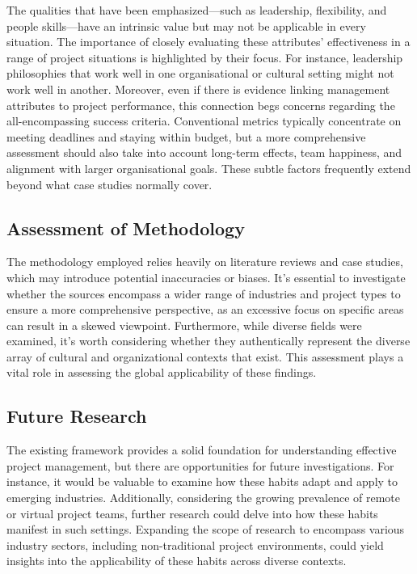 \documentclass{article}
\begin{document}
The qualities that have been emphasized—such as leadership, flexibility, and people skills—have an intrinsic value but may not be applicable in every situation. The importance of closely evaluating these attributes' effectiveness in a range of project situations is highlighted by their focus. For instance, leadership philosophies that work well in one organisational or cultural setting might not work well in another. Moreover, even if there is evidence linking management attributes to project performance, this connection begs concerns regarding the all-encompassing success criteria. Conventional metrics typically concentrate on meeting deadlines and staying within budget, but a more comprehensive assessment should also take into account long-term effects, team happiness, and alignment with larger organisational goals. These subtle factors frequently extend beyond what case studies normally cover.

\subsection{Assessment of Methodology}

The methodology employed relies heavily on literature reviews and case studies, which may introduce potential inaccuracies or biases. It's essential to investigate whether the sources encompass a wider range of industries and project types to ensure a more comprehensive perspective, as an excessive focus on specific areas can result in a skewed viewpoint. Furthermore, while diverse fields were examined, it's worth considering whether they authentically represent the diverse array of cultural and organizational contexts that exist. This assessment plays a vital role in assessing the global applicability of these findings.

\subsection{Future Research}

The existing framework provides a solid foundation for understanding effective project management, but there are opportunities for future investigations. For instance, it would be valuable to examine how these habits adapt and apply to emerging industries. Additionally, considering the growing prevalence of remote or virtual project teams, further research could delve into how these habits manifest in such settings. Expanding the scope of research to encompass various industry sectors, including non-traditional project environments, could yield insights into the applicability of these habits across diverse contexts.
\end{document}
